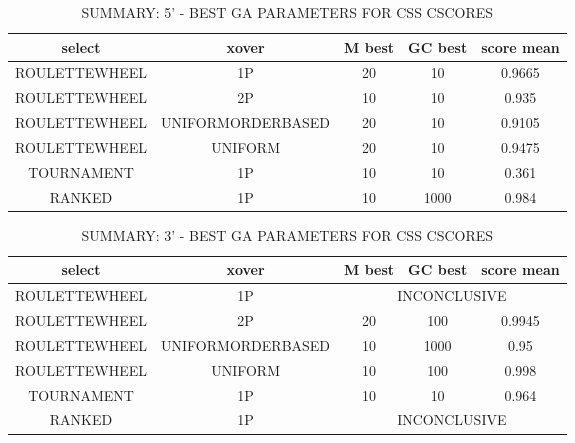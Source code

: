 \begin{table}[H]
\centering
\caption{SUMMARY: 5' - BEST GA PARAMETERS FOR CSS CSCORES }
\vspace{5mm}
\begin{adjustbox}{width=1\textwidth}
\begin{tabular}{ |c|c|c|c|c| }
\hline
select & xover & M best & GC best & score mean\\
\hline
\hline
ROULETTEWHEEL & 1P & 20 & 10 & 0.9665\\
\hline
ROULETTEWHEEL & 2P & 10 & 10 & 0.935\\
\hline
ROULETTEWHEEL & UNIFORMORDERBASED & 20 & 10 & 0.9105\\
\hline
ROULETTEWHEEL & UNIFORM & 20 & 10 & 0.9475\\
\hline
TOURNAMENT & 1P & 10 & 10 & 0.361\\
\hline
RANKED & 1P & 10 & 1000 & 0.984\\
\hline
\end{tabular}
\end{adjustbox}
\label{tab-css-cscore5}
\end{table}


\begin{table}[H]
\centering
\caption{SUMMARY: 3' - BEST GA PARAMETERS FOR CSS CSCORES }
\vspace{5mm}
\begin{adjustbox}{width=1\textwidth}
\begin{tabular}{ |c|c|c|c|c| }
\hline
select & xover & M best & GC best & score mean\\
\hline
\hline
ROULETTEWHEEL & 1P & \multicolumn{3}{c|}{INCONCLUSIVE}\\
\hline
ROULETTEWHEEL & 2P & 20 & 100 & 0.9945\\
\hline
ROULETTEWHEEL & UNIFORMORDERBASED & 10 & 1000 & 0.95\\
\hline
ROULETTEWHEEL & UNIFORM & 10 & 100 & 0.998\\
\hline
TOURNAMENT & 1P & 10 & 10 & 0.964\\
\hline
RANKED & 1P & \multicolumn{3}{c|}{INCONCLUSIVE}\\
\hline
\end{tabular}
\end{adjustbox}
\label{tab-css-cscore3}
\end{table}

